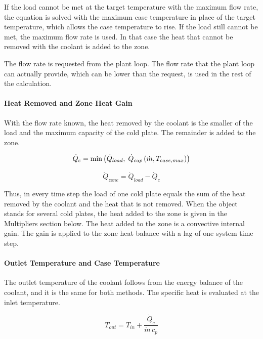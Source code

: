 If the load cannot be met at the target temperature with the maximum flow rate, the equation is solved with the maximum case temperature in place of the target temperature, which allows the case temperature to rise. If the load still cannot be met, the maximum flow rate is used. In that case the heat that cannot be removed with the coolant is added to the zone.

The flow rate is requested from the plant loop. The flow rate that the plant loop can actually provide, which can be lower than the request, is used in the rest of the calculation.

\paragraph{Heat Removed and Zone Heat Gain}\label{heat-removed-and-zone-heat-gain-coilcoolingitecoldplate}

With the flow rate known, the heat removed by the coolant is the smaller of the load and the maximum capacity of the cold plate. The remainder is added to the zone.

\begin{equation}
\dot{Q}_{c} = \min\left(\dot{Q}_{load}, \; \dot{Q}_{cap}\left(\dot{m}, T_{case,max}\right)\right)
\end{equation}

\begin{equation}
\dot{Q}_{zone} = \dot{Q}_{load} - \dot{Q}_{c}
\end{equation}

Thus, in every time step the load of one cold plate equals the sum of the heat removed by the coolant and the heat that is not removed. When the object stands for several cold plates, the heat added to the zone is given in the Multipliers section below. The heat added to the zone is a convective internal gain. The gain is applied to the zone heat balance with a lag of one system time step.

\paragraph{Outlet Temperature and Case Temperature}\label{outlet-temperature-and-case-temperature-coilcoolingitecoldplate}

The outlet temperature of the coolant follows from the energy balance of the coolant, and it is the same for both methods. The specific heat is evaluated at the inlet temperature.

\begin{equation}
T_{out} = T_{in} + \frac{\dot{Q}_{c}}{\dot{m} \, c_p}
\end{equation}

